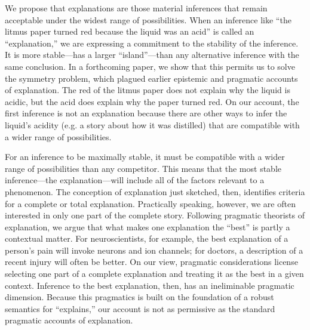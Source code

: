\documentclass{article}[11pt]
\begin{document}
We propose that explanations are those material inferences that remain acceptable under the widest range of possibilities.  When an inference like ``the litmus paper turned red  because the liquid was an acid'' is called an ``explanation,'' we are expressing a commitment to the stability of the inference.  It is more stable---has a larger ``island''---than any alternative inference with the same conclusion. In a forthcoming paper, we show that this permits us to solve the symmetry problem, which plagued earlier epistemic and pragmatic accounts of explanation.  The red of the litmus paper does not explain why the liquid is acidic, but the acid does explain why the paper turned red.  On our account, the first inference is not an explanation because there are other ways to infer the liquid's acidity (e.g. a story about how it was distilled) that are compatible with a wider range of possibilities.  

For an inference to be maximally stable,  it must be compatible with a wider range of possibilities than any competitor.  This means that the most stable inference---the explanation---will include all of the factors relevant to a phenomenon. The conception of explanation just sketched, then, identifies criteria for a complete or total explanation. Practically speaking, however, we are often interested in only one part of the complete story. Following pragmatic theorists of explanation, we argue that what makes one explanation the ``best'' is partly a contextual matter.  For neuroscientists, for example, the best explanation of a person’s pain will invoke neurons and ion channels; for doctors, a description of a recent injury will often be better. On our view, pragmatic considerations license selecting one part of a complete explanation and treating it as the best in a given context.  Inference to the best explanation, then, has an ineliminable pragmatic dimension. Because this pragmatics is built on the foundation of a robust semantics for ``explains,'' our account is not as permissive as the standard pragmatic accounts of explanation.
\end{document}
